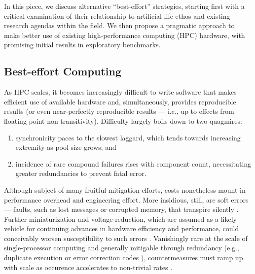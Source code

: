 In this piece, we discuss alternative ``best-effort'' strategies, starting first with a critical examination of their relationship to artificial life ethos and existing research agendas within the field.
We then propose a pragmatic approach to make better use of existing high-performance computing (HPC) hardware, with promising initial results in exploratory benchmarks.

\subsection{Best-effort Computing}

As HPC scales, it becomes increasingly difficult to write software that makes efficient use of available hardware and, simultaneously, provides reproducible results (or even near-perfectly reproducible results --- i.e., up to effects from floating point non-transitivity).
Difficulty largely boils down to two quagmires:
\begin{enumerate}
\item synchronicity paces to the slowest laggard, which tends towards increasing extremity as pool size grows; and
\item incidence of rare compound failures rises with component count, necessitating greater redundancies to prevent fatal error.
\end{enumerate}
Although subject of many fruitful mitigation efforts, costs nonetheless mount in performance overhead and engineering effort.
More insidious, still, are soft errors --- faults, such as lost messages or corrupted memory, that transpire silently \citep{karnik2004characterization}.
Further miniaturization and voltage reduction, which are assumed as a likely vehicle for continuing advances in hardware efficiency and performance, could conceivably worsen susceptibility to such errors \citep{dongarra2014applied,kajmakovic2020challenges}.
Vanishingly rare at the scale of single-processor computing and generally mitigable through redundancy (e.g., duplicate execution or error correction codes \citep{vankeirsbilck2015soft,sridharan2015memory}), countermeasures must ramp up with scale as occurence accelerates to non-trivial rates \citep{sridharan2015memory,scoles2018cosmic}.

